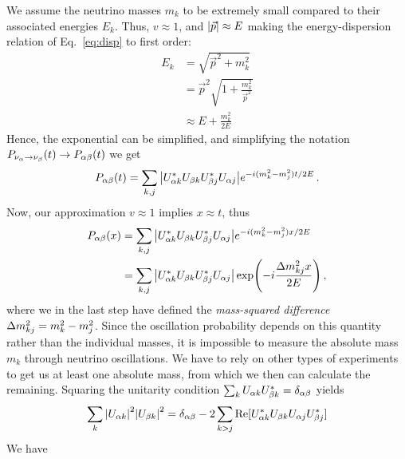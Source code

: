 We assume the neutrino masses $m_k$ to be extremely small compared to their associated energies $E_k$. 
Thus, $v\approx 1$, and $\abs{\vec{p}} \approx E$ making the energy-dispersion relation of Eq.~\ref{eq:disp} to first order:
\begin{align}\label{eq:ultra_rel}
    E_k &= \sqrt{{\vec{p}}^2 + m_k^2} \nonumber \\
        &= {\vec{p}}^2\sqrt{1 + \frac{m_k^2}{\vec{p}^2}} \nonumber \\
        &\approx E + \frac{m_k^2}{2E}
\end{align}
Hence, the exponential can be simplified, and simplifying the notation $P_{\nu_\alpha \to \nu_\beta}(t) \to P_{\alpha\beta}(t)$ we get 
\begin{align}
    P_{\alpha\beta}(t) = \sum_{k,j} \abs{U^*_{\alpha k}U_{\beta k}U^*_{\beta j}U_{\alpha j}} e^{-i(m_k^2-m_j^2)t/2E}\,.
\end{align}
Now, our approximation $v\approx 1$ implies $x\approx t $, thus
\begin{align}
    P_{\ab}(x) &= \sum_{k,j} \abs{U^*_{\a k}U_{\b k}U^*_{\b j}U_{\a j}} e^{-i(m_k^2-m_j^2)x/2E} \nonumber \\
                       &= \sum_{k,j} \abs{U^*_{\a k}U_{\b k}U^*_{\b j}U_{\a j}} \exp(-i\frac{\dm_{kj}x}{2E})\,,
\end{align}
where we in the last step have defined the \emph{mass-squared difference} $\dm_{kj} = m_k^2 - m_j^2$. Since the oscillation probability depends on this quantity
rather than the individual masses, it is impossible to measure the absolute mass $m_k$ through neutrino oscillations. We have
to rely on other types of experiments to get us at least one absolute mass, from which we then can calculate the remaining.
Squaring the unitarity condition $\sum_k U_{\alpha k}U_{\beta k}^* = \delta_{\alpha \beta}$ yields 
\begin{align}
    \sum_k \abs{U_{\alpha k}}^2\abs{U_{\beta k}}^2 = \delta_{\alpha \beta} - 2 \sum_{k>j}\Re[U_{\alpha k}^* U_{\beta k} U_{\alpha j} U_{\beta j}^*]
\end{align}
We have
